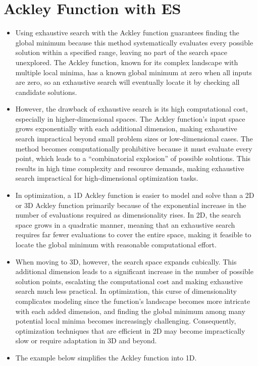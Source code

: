 \documentclass[
  letterpaper,
  DIV=11,
  numbers=noendperiod]{scrreprt}
\makeatletter
\providecommand{\tightlist}{%
  \setlength{\itemsep}{0pt}\setlength{\parskip}{0pt}}\usepackage{longtable,booktabs,array}
\newcommand*\pandocbounded[1]{%
  \sbox\pandoc@box{#1}%
  \Gscale@div\@tempa{\textheight}{\dimexpr\ht\pandoc@box+\dp\pandoc@box\relax}%
  \Gscale@div\@tempb{\linewidth}{\wd\pandoc@box}%
  \ifdim\@tempb\p@<\@tempa\p@\let\@tempa\@tempb\fi%
  \ifdim\@tempa\p@<\p@\scalebox{\@tempa}{\usebox\pandoc@box}%
  \else\usebox{\pandoc@box}%
  \fi%
}
\makeatother
\begin{document}
\pandocbounded{\texttt{[image: es\_files/figure-pdf/cell-11-output-2.pdf]}}


\chapter{Ackley Function with ES}\label{ackley-function-with-es}

\begin{itemize}
\tightlist
\item
  Using exhaustive search with the Ackley function guarantees finding
  the global minimum because this method systematically evaluates every
  possible solution within a specified range, leaving no part of the
  search space unexplored. The Ackley function, known for its complex
  landscape with multiple local minima, has a known global minimum at
  zero when all inputs are zero, so an exhaustive search will eventually
  locate it by checking all candidate solutions.
\item
  However, the drawback of exhaustive search is its high computational
  cost, especially in higher-dimensional spaces. The Ackley function's
  input space grows exponentially with each additional dimension, making
  exhaustive search impractical beyond small problem sizes or
  low-dimensional cases. The method becomes computationally prohibitive
  because it must evaluate every point, which leads to a ``combinatorial
  explosion'' of possible solutions. This results in high time
  complexity and resource demands, making exhaustive search impractical
  for high-dimensional optimization tasks.
\item
  In optimization, a 1D Ackley function is easier to model and solve
  than a 2D or 3D Ackley function primarily because of the exponential
  increase in the number of evaluations required as dimensionality
  rises. In 2D, the search space grows in a quadratic manner, meaning
  that an exhaustive search requires far fewer evaluations to cover the
  entire space, making it feasible to locate the global minimum with
  reasonable computational effort.
\item
  When moving to 3D, however, the search space expands cubically. This
  additional dimension leads to a significant increase in the number of
  possible solution points, escalating the computational cost and making
  exhaustive search much less practical. In optimization, this curse of
  dimensionality complicates modeling since the function's landscape
  becomes more intricate with each added dimension, and finding the
  global minimum among many potential local minima becomes increasingly
  challenging. Consequently, optimization techniques that are efficient
  in 2D may become impractically slow or require adaptation in 3D and
  beyond.
\item
  The example below simplifies the Ackley function into 1D.
\end{itemize}
\end{document}
